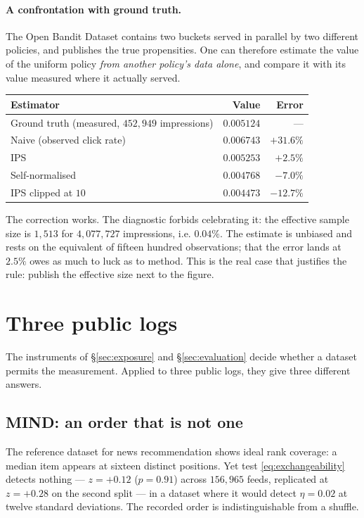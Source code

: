 \documentclass[11pt,a4paper]{article}
\begin{document}
\paragraph{A confrontation with ground truth.} The Open Bandit Dataset \citep{saito2020}
contains two buckets served in parallel by two different policies, and publishes the true
propensities. One can therefore estimate the value of the uniform policy \emph{from another
policy's data alone}, and compare it with its value measured where it actually served.

\begin{center}
\begin{tabular}{@{}lrr@{}}
\toprule
\textbf{Estimator} & \textbf{Value} & \textbf{Error} \\
\midrule
Ground truth (measured, $452{,}949$ impressions) & $0.005124$ & --- \\
Naive (observed click rate) & $0.006743$ & $+31.6\%$ \\
IPS & $0.005253$ & $\mathbf{+2.5\%}$ \\
Self-normalised & $0.004768$ & $-7.0\%$ \\
IPS clipped at $10$ & $0.004473$ & $-12.7\%$ \\
\bottomrule
\end{tabular}
\end{center}

The correction works. The diagnostic forbids celebrating it: the effective sample size is
$1{,}513$ for $4{,}077{,}727$ impressions, i.e. $0.04\%$. The estimate is unbiased and rests on
the equivalent of fifteen hundred observations; that the error lands at $2.5\%$ owes as much to
luck as to method. This is the real case that justifies the rule: publish the effective size
next to the figure.

\section{Three public logs}
\label{sec:logs}

The instruments of \S\ref{sec:exposure} and \S\ref{sec:evaluation} decide whether a dataset
permits the measurement. Applied to three public logs, they give three different answers.

\subsection{MIND: an order that is not one}

The reference dataset for news recommendation \citep{wu2020} shows ideal rank coverage: a median
item appears at sixteen distinct positions. Yet test \eqref{eq:exchangeability} detects nothing
--- $z = +0.12$ ($p = 0.91$) across $156{,}965$ feeds, replicated at $z = +0.28$ on the second
split --- in a dataset where it would detect $\eta = 0.02$ at twelve standard deviations. The
recorded order is indistinguishable from a shuffle.
\end{document}
